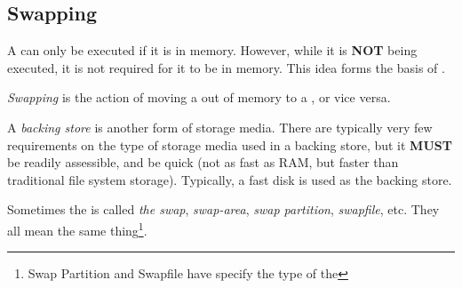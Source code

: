 \subsection{Swapping}\label{subsec:Swapping}
A  can only be executed if it is in memory.
However, while it is \textbf{NOT} being executed, it is not required for it to be in memory.
This idea forms the basis of .

\begin{definition}[Swapping]\label{def:Swapping}
  \emph{Swapping} is the action of moving a  out of memory to a , or vice versa.
\end{definition}

\begin{definition}\label{def:Backing_Store}
  A \emph{backing store} is another form of storage media.
  There are typically very few requirements on the type of storage media used in a backing store, but it \textbf{MUST} be readily assessible, and be quick (not as fast as RAM, but faster than traditional file system storage).
  Typically, a fast disk is used as the backing store.

  \begin{remark}[Swap]\label{rmk:Swap}
    Sometimes the  is called \emph{the swap}, \emph{swap-area}, \emph{swap partition}, \emph{swapfile}, etc.
    They all mean the same thing\footnote{Swap Partition and Swapfile have specify the type of the }.
  \end{remark}
\end{definition}


